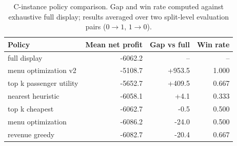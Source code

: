 \begin{table}[t]
\centering
\caption{C-instance policy comparison. Gap and win rate computed against exhaustive full display; results averaged over two split-level evaluation pairs ($0{\to}1$, $1{\to}0$).}
\label{tab:c_main}
\begin{tabular}{lrrr}
\hline
Policy & Mean net profit & Gap vs full & Win rate \\
\hline
full display & -6062.2 & -- & -- \\
menu optimization v2 & -5108.7 & +953.5 & 1.000 \\
top k passenger utility & -5652.7 & +409.5 & 0.667 \\
nearest heuristic & -6058.1 & +4.1 & 0.333 \\
top k cheapest & -6062.7 & -0.5 & 0.500 \\
menu optimization & -6086.2 & -24.0 & 0.500 \\
revenue greedy & -6082.7 & -20.4 & 0.667 \\
\hline
\end{tabular}
\end{table}
